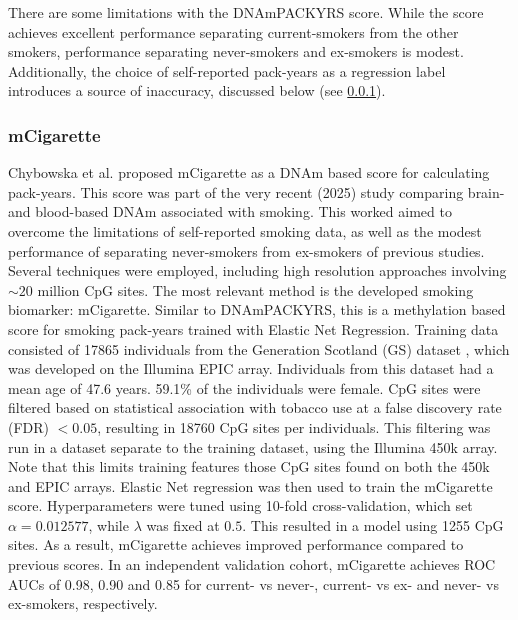 \documentclass{article} %
\begin{document}
There are some limitations with the DNAmPACKYRS score. While the score achieves excellent performance separating current-smokers from the other smokers, performance separating never-smokers and ex-smokers is modest. Additionally, the choice of self-reported pack-years as a regression label introduces a source of inaccuracy, discussed below (see \ref{sec:mcigarette}).


\subsubsection{mCigarette} \label{sec:mcigarette}
Chybowska et al. \cite{chybowska2025blood} proposed mCigarette as a DNAm based score for calculating pack-years. This score was part of the very recent (2025) study comparing brain- and blood-based DNAm associated with smoking. This worked aimed to overcome the limitations of self-reported smoking data, as well as the modest performance of separating never-smokers from ex-smokers of previous studies. Several techniques were employed, including high resolution approaches involving \(\sim \! 20\) million CpG sites. The most relevant method is the developed smoking biomarker: mCigarette. Similar to DNAmPACKYRS, this is a methylation based score for smoking pack-years trained with Elastic Net Regression. Training data consisted of \num{17865} individuals from the Generation Scotland (GS) dataset \cite{smith2006generation}, which was developed on the Illumina EPIC array. Individuals from this dataset had a mean age of 47.6 years. 59.1\% of the individuals were female. CpG sites were filtered based on statistical association with tobacco use at a false discovery rate (FDR) \(< 0.05\), resulting in \num{18760} CpG sites per individuals. This filtering was run in a dataset separate to the training dataset, using the Illumina 450k array. Note that this limits training features those CpG sites found on both the 450k and EPIC arrays. Elastic Net regression was then used to train the mCigarette score. Hyperparameters were tuned using 10-fold cross-validation, which set \(\alpha = 0.012577\), while \(\lambda\) was fixed at \(0.5\). This resulted in a model using \num{1255} CpG sites. As a result, mCigarette achieves improved performance compared to previous scores. In an independent validation cohort, mCigarette achieves ROC AUCs of 0.98, 0.90 and 0.85 for current- vs never-, current- vs ex- and never- vs ex-smokers, respectively.
\end{document}
